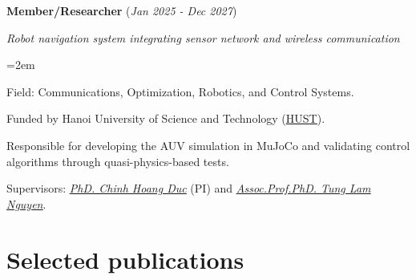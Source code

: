 \documentclass[10pt]{article}
\let\oldhref\href
\renewcommand{\href}[2]{\oldhref{#1}{\ul{#2}}}
\newlength{\skilllabelwidth}
\newcommand{\skill}[2]{%
	\noindent
	\parbox[t]{\skilllabelwidth}{\raggedright\textbf{#1}}%
	\hspace{0.75em}%
	\parbox[t]{\dimexpr\linewidth-\skilllabelwidth-0.75em\relax}{%
		\setlength{\baselineskip}{1.35\baselineskip}%
		#2%
	}\par\vspace{0.7em} %
}
\newcommand{\project}[4]{%
	\noindent \textbf{#1} (\textit{#2})\par
	\vspace{0.5em}
	\noindent \textit{\vspace{0.15cm}#3}\par
	\vspace{0.5em}
	\noindent\hangindent=2em\hangafter=0 #4 \par\normalsize
}
\begin{document}
		\project{Member/Researcher}{Jan 2025 - Dec 2027}{Robot navigation system integrating sensor network and wireless communication}
		{\begin{soloitemize}
				\item Field: Communications, Optimization, Robotics, and Control Systems.
				\item Funded by Hanoi University of Science and Technology (\href{https://hust.edu.vn/en/}{HUST}).
				\item Responsible for developing the AUV simulation in MuJoCo and validating control algorithms through quasi-physics-based tests.
				\item Supervisors: \href{https://scholar.google.com/citations?user=mI561CkAAAAJ&hl=en}{\textit{PhD. Chinh Hoang Duc}} (PI)
				and 
				\href{https://scholar.google.com/citations?user=MlJ_2-wAAAAJ&hl=en}{\textit{Assoc.Prof.PhD. Tung Lam Nguyen}}.
		\end{soloitemize}
		}

	
%	
%	
%	
%	
%	
%	
	
	
	
	
	\section*{Selected publications}
	
\end{document}
